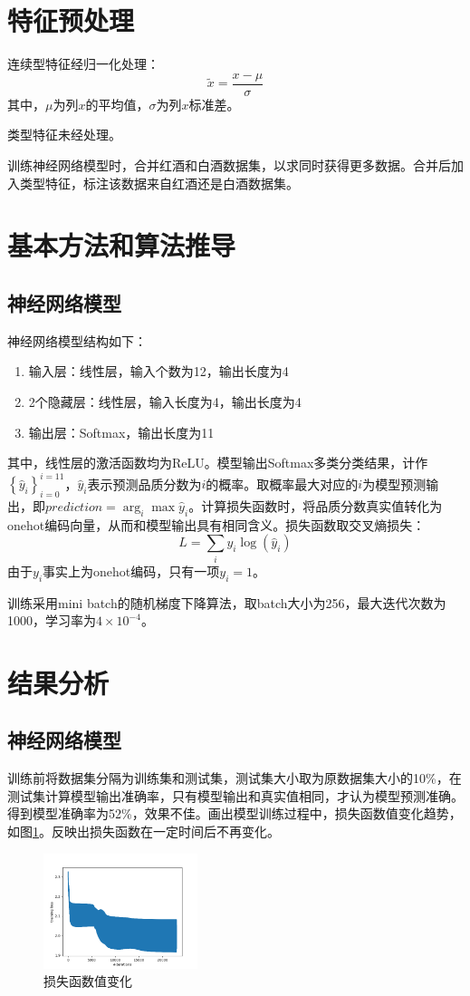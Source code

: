 \documentclass{article}
\begin{document}
\section{特征预处理}

连续型特征经归一化处理：
$$
\tilde{x} = \frac{x - \mu}{\sigma}
$$
其中，$\mu$为列$x$的平均值，$\sigma$为列$x$标准差。

类型特征未经处理。

训练神经网络模型时，合并红酒和白酒数据集，以求同时获得更多数据。合并后加入类型特征，标注该数据来自红酒还是白酒数据集。

\section{基本方法和算法推导}
\subsection{神经网络模型}

神经网络模型结构如下：

\begin{enumerate}
    \item 输入层：线性层，输入个数为12，输出长度为4
    \item 2个隐藏层：线性层，输入长度为4，输出长度为4
    \item 输出层：Softmax，输出长度为11
\end{enumerate}

其中，线性层的激活函数均为ReLU。模型输出Softmax多类分类结果，计作$\left\{\hat y_i\right\}_{i=0}^{i=11}$，$\hat y_i$表示预测品质分数为$i$的概率。取概率最大对应的$i$为模型预测输出，即$prediction=\arg_i\max \hat y_i$。计算损失函数时，将品质分数真实值转化为onehot编码向量，从而和模型输出具有相同含义。损失函数取交叉熵损失：
$$
L = \sum_i y_i \log(\hat y_i)
$$
由于$y_i$事实上为onehot编码，只有一项$y_i=1$。

训练采用mini batch的随机梯度下降算法，取batch大小为256，最大迭代次数为1000，学习率为$4\times10^{-4}$。

\section{结果分析}
\subsection{神经网络模型}

训练前将数据集分隔为训练集和测试集，测试集大小取为原数据集大小的10\%，在测试集计算模型输出准确率，只有模型输出和真实值相同，才认为模型预测准确。得到模型准确率为52\%，效果不佳。画出模型训练过程中，损失函数值变化趋势，如图\ref{fig:loss}。反映出损失函数在一定时间后不再变化。

\begin{figure}[htbp] %
    \centering %
    \includegraphics[width=0.4\textwidth]{loss_plot.png}
    \caption{损失函数值变化}
    \label{fig:loss}
\end{figure}
\end{document}

